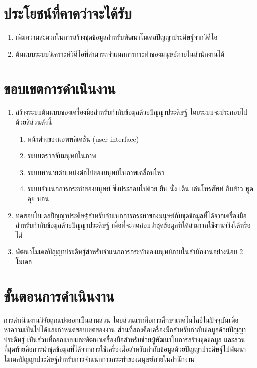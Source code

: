 
\section{ประโยชน์ที่คาดว่าจะได้รับ}
\begin{enumerate}
	\setlength\itemsep{-0.25em}
	\item เพิ่มความสะดวกในการสร้างชุดข้อมูลสำหรับพัฒนาโมเดลปัญญาประดิษฐ์จากวิดีโอ
	\item ต้นแบบระบบวิเคราะห์วิดีโอที่สามารถจำแนกการกระทำของมนุษย์ภายในสำนักงานได้
\end{enumerate}
\clearpage

\section{ขอบเขตการดำเนินงาน}
\begin{enumerate}
	\setlength\itemsep{-0.25em}
	\item สร้างระบบต้นแบบของเครื่องมือสำหรับกำกับข้อมูลด้วยปัญญาประดิษฐ์ โดยระบบจะประกอบไปด้วยสี่ส่วนดังนี้
	\begin{enumerate}
		\setlength\itemsep{-0.25em}
		\item หน้าต่างของแอพพลิเคชั่น (user interface)
		\item ระบบตรวจจับมนุษย์ในภาพ
		\item ระบบทำนายตำแหน่งต่อไปของมนุษย์ในภาพเคลื่อนไหว
		\item ระบบจำแนกการกระทำของมนุษย์ ซึ่งประกอบไปด้วย ยืน นั่ง เดิน เล่นโทรศัพท์ กินข้าว พูดคุย นอน
	\end{enumerate}
	\item ทดสอบโมเดลปัญญาประดิษฐ์สำหรับจำแนกการกระทำของมนุษย์กับชุดข้อมูลที่ได้จากเครื่องมือสำหรับกำกับข้อมูลด้วยปัญญาประดิษฐ์ เพื่อที่จะทดสอบว่าชุดข้อมูลที่ได้สามารถใช้งานจริงได้หรือไม่
	\item พัฒนาโมเดลปัญญาประดิษฐ์สำหรับจำแนกการกระทำของมนุษย์ภายในสำนักงานอย่างน้อย 2 โมเดล
\end{enumerate}

\section{ขั้นตอนการดำเนินงาน}
การดำเนินงานวิจัยถูกแบ่งออกเป็นสามส่วน โดยส่วนแรกคือการศึกษาเทคโนโลยีในปัจจุบันเพื่อหาความเป็นไปได้และกำหนดขอบเขตของงาน 
ส่วนที่สองคือเครื่องมือสำหรับกำกับข้อมูลด้วยปัญญาประดิษฐ์ เป็นส่วนที่ออกแบบและพัฒนาเครื่องมือสำหรับช่วยผู้พัฒนาในการสร้างชุดข้อมูล 
และส่วนที่สุดท้ายคือการนำชุดข้อมูลที่ได้จากการใช้เครื่องมือสำหรับกำกับข้อมูลด้วยปัญญาประดิษฐ์ไปพัฒนาโมเดลปัญญาประดิษฐ์สำหรับการจำแนกการกระทำของมนุษย์ภายในสำนักงาน
